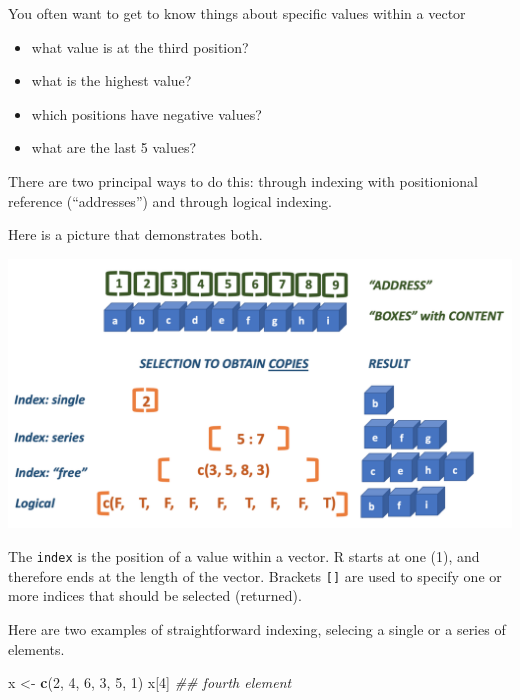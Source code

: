 \documentclass[]{book}
\newenvironment{Shaded}{\begin{snugshade}}{\end{snugshade}}
\newcommand{\CommentTok}[1]{\textcolor[rgb]{0.56,0.35,0.01}{\textit{#1}}}
\newcommand{\DecValTok}[1]{\textcolor[rgb]{0.00,0.00,0.81}{#1}}
\newcommand{\KeywordTok}[1]{\textcolor[rgb]{0.13,0.29,0.53}{\textbf{#1}}}
\newcommand{\NormalTok}[1]{#1}
\newcommand{\StringTok}[1]{\textcolor[rgb]{0.31,0.60,0.02}{#1}}
\providecommand{\tightlist}{%
  \setlength{\itemsep}{0pt}\setlength{\parskip}{0pt}}
\begin{document}
You often want to get to know things about specific values within a vector

\begin{itemize}
\tightlist
\item
  what value is at the third position?
\item
  what is the highest value?
\item
  which positions have negative values?
\item
  what are the last 5 values?
\end{itemize}

There are two principal ways to do this: through indexing with positionional reference (``addresses'') and through logical indexing.

Here is a picture that demonstrates both.

\includegraphics{figures/indexing_in_R_s.png}

The \texttt{index} is the position of a value within a vector. R starts at one (1), and therefore ends at the length of the vector. Brackets \texttt{{[}{]}} are used to specify one or more indices that should be selected (returned).

Here are two examples of straightforward indexing, selecing a single or a series of elements.

\begin{Shaded}
\begin{Highlighting}[]
\NormalTok{x <-}\StringTok{ }\KeywordTok{c}\NormalTok{(}\DecValTok{2}\NormalTok{, }\DecValTok{4}\NormalTok{, }\DecValTok{6}\NormalTok{, }\DecValTok{3}\NormalTok{, }\DecValTok{5}\NormalTok{, }\DecValTok{1}\NormalTok{)}
\NormalTok{x[}\DecValTok{4}\NormalTok{] }\CommentTok{## fourth element}
\end{Highlighting}
\end{Shaded}
\end{document}
